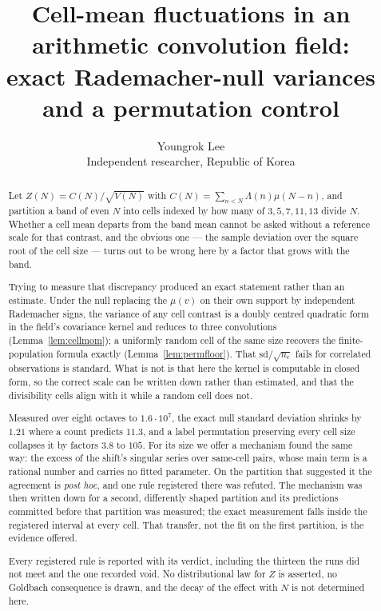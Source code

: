 \documentclass[11pt,a4paper]{article}
\title{Cell-mean fluctuations in an arithmetic convolution field:\\
exact Rademacher-null variances and a permutation control}
\author{Youngrok Lee\\
\small Independent researcher, Republic of Korea}
\date{}
\theoremstyle{plain}
\theoremstyle{definition}
\theoremstyle{remark}
\begin{document}
\maketitle

\begin{abstract}
Let $Z(N)=C(N)/\sqrt{V(N)}$ with
$C(N)=\sum_{n<N}\Lambda(n)\mu(N-n)$, and partition a band of even $N$
into cells indexed by how many of $3,5,7,11,13$ divide $N$. Whether a
cell mean departs from the band mean cannot be asked without a
reference scale for that contrast, and the obvious one --- the sample
deviation over the square root of the cell size --- turns out to be
wrong here by a factor that grows with the band.

Trying to measure that discrepancy produced an exact statement rather
than an estimate. Under the null replacing the $\mu(v)$ on their own
support by independent Rademacher signs, the variance of any cell
contrast is a doubly centred quadratic form in the field's covariance
kernel and reduces to three convolutions
(Lemma~\ref{lem:cellmom}); a uniformly random cell of the same size
recovers the finite-population formula exactly
(Lemma~\ref{lem:permfloor}). That $\mathrm{sd}/\sqrt{n_c}$ fails for
correlated observations is standard. What is not is that here the
kernel is computable in closed form, so the correct scale can be
written down rather than estimated, and that the divisibility cells
align with it while a random cell does not.

Measured over eight octaves to $1.6\cdot10^{7}$, the exact null
standard deviation shrinks by $1.21$ where a count predicts $11.3$, and
a label permutation preserving every cell size collapses it by factors
$3.8$ to $105$. For its size we offer a mechanism found the same way:
the excess of the shift's singular series over same-cell pairs, whose
main term is a rational number and carries no fitted parameter. On the
partition that suggested it the agreement is \emph{post hoc}, and one
rule registered there was refuted. The mechanism was then written down
for a second, differently shaped partition and its predictions
committed before that partition was measured; the exact measurement
falls inside the registered interval at every cell. That transfer, not
the fit on the first partition, is the evidence offered.

Every registered rule is reported with its verdict, including the
thirteen the runs did not meet and the one recorded void. No
distributional law for $Z$ is asserted, no Goldbach consequence is
drawn, and the decay of the effect with $N$ is not determined here.
\end{abstract}
\end{document}
